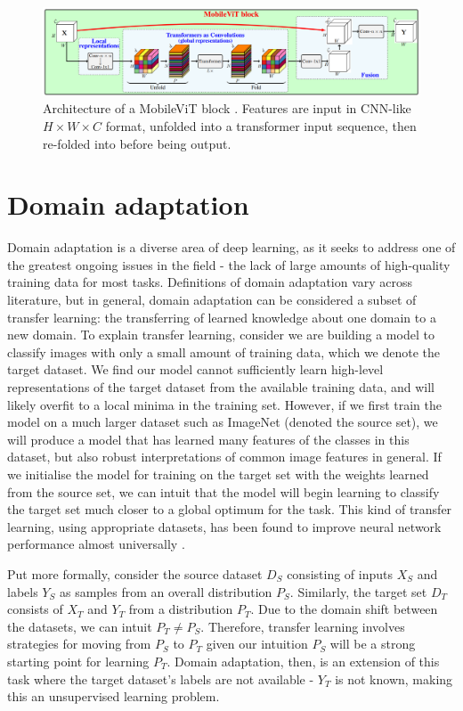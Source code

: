 \documentclass[a4paper,12pt]{report}
\begin{document}
    \begin{figure}[ht!]
        \centering
        \includegraphics[width=\textwidth]{res/mobilevit-block.png}
        \caption{Architecture of a MobileViT block \cite{mehta_mobilevit_2022}. Features are input in CNN-like $H \times W \times C$ format, unfolded into a transformer input sequence, then re-folded into before being output.}
        \label{fig:mobilevit_block}
    \end{figure}
    
    \section{Domain adaptation}
    
    Domain adaptation is a diverse area of deep learning, as it seeks to address one of the greatest ongoing issues in the field - the lack of large amounts of high-quality training data for most tasks. Definitions of domain adaptation vary across literature, but in general, domain adaptation can be considered a subset of transfer learning: the transferring of learned knowledge about one domain to a new domain. To explain transfer learning, consider we are building a model to classify images with only a small amount of training data, which we denote the target dataset. We find our model cannot sufficiently learn high-level representations of the target dataset from the available training data, and will likely overfit to a local minima in the training set. However, if we first train the model on a much larger dataset such as ImageNet (denoted the source set), we will produce a model that has learned many features of the classes in this dataset, but also robust interpretations of common image features in general. If we initialise the model for training on the target set with the weights learned from the source set, we can intuit that the model will begin learning to classify the target set much closer to a global optimum for the task. This kind of transfer learning, using appropriate datasets, has been found to improve neural network performance almost universally \cite{sun_revisiting_2017}.
    
    Put more formally, consider the source dataset $D_S$ consisting of inputs $X_S$ and labels $Y_S$ as samples from an overall distribution $P_S$. Similarly, the target set $D_T$ consists of $X_T$ and $Y_T$ from a distribution $P_T$. Due to the domain shift between the datasets, we can intuit $P_T \neq P_S$. Therefore, transfer learning involves strategies for moving from $P_S$ to $P_T$ given our intuition $P_S$ will be a strong starting point for learning $P_T$. Domain adaptation, then, is an extension of this task where the target dataset's labels are not available \cite{wilson_survey_2020} - $Y_T$ is not known, making this an unsupervised learning problem.
    
\end{document}
